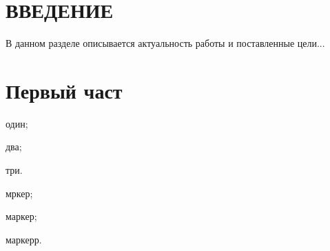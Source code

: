 \documentclass[paper=a4, fontsize=14pt, pagesize, DIV=calc, oneside]{scrreport}
\begin{document}
\pagestyle{empty} 



\newpage
\tableofcontents
\newpage

\pagestyle{plain}
\setcounter{page}{2} 



\chapter*{ВВЕДЕНИЕ}











В данном разделе описывается актуальность работы и поставленные цели...





\chapter{Первый част}









\begin{}

    \item один;

    \item два;

    \item три.

\end{}


\begin{}

    \item мркер;

    \item маркер;

    \item маркерр.

\end{}
\end{document}
